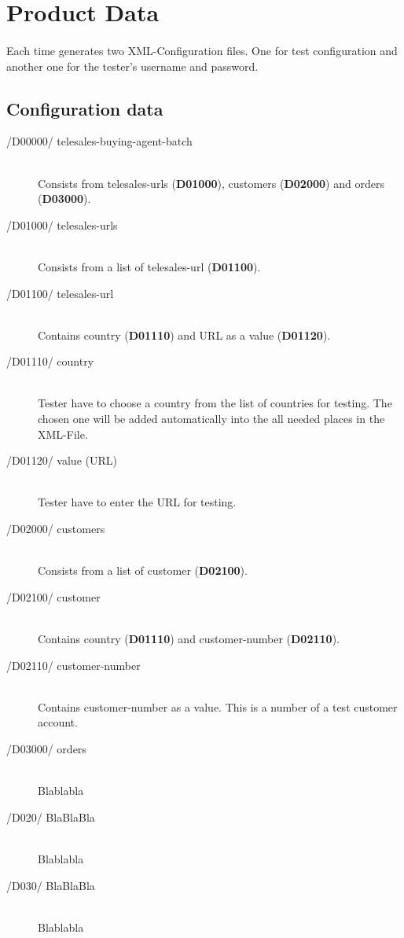 \section{Product Data}
\paragraph{}Each time \app{} generates two XML-Configuration files. One for test configuration and another one for the tester's username and password.

\subsection{Configuration data}
\begin{description}
\item[/D00000/ telesales-buying-agent-batch]\hfill \\ Consists from  telesales-urls (\textbf{D01000}), customers (\textbf{D02000}) and orders (\textbf{D03000}).
\item[/D01000/ telesales-urls]\hfill \\ Consists from a list of telesales-url (\textbf{D01100}).
\item[/D01100/ telesales-url]\hfill \\ Contains country (\textbf{D01110}) and URL as a value (\textbf{D01120}).
\item[/D01110/ country]\hfill \\ Tester have to choose a country from the list of countries for testing. The chosen one will be added automatically into the all needed places in the XML-File.
\item[/D01120/ value (URL)]\hfill \\ Tester have to enter the URL for testing.

\item[/D02000/ customers]\hfill \\ Consists from a list of customer (\textbf{D02100}).
\item[/D02100/ customer]\hfill \\ Contains country (\textbf{D01110}) and customer-number (\textbf{D02110}).
\item[/D02110/ customer-number]\hfill \\ Contains customer-number as a value. This is a number of a test customer account.

\item[/D03000/ orders]\hfill \\ Blablabla


\item[/D020/ BlaBlaBla]\hfill \\ Blablabla
\item[/D030/ BlaBlaBla]\hfill \\ Blablabla
\end{description}


